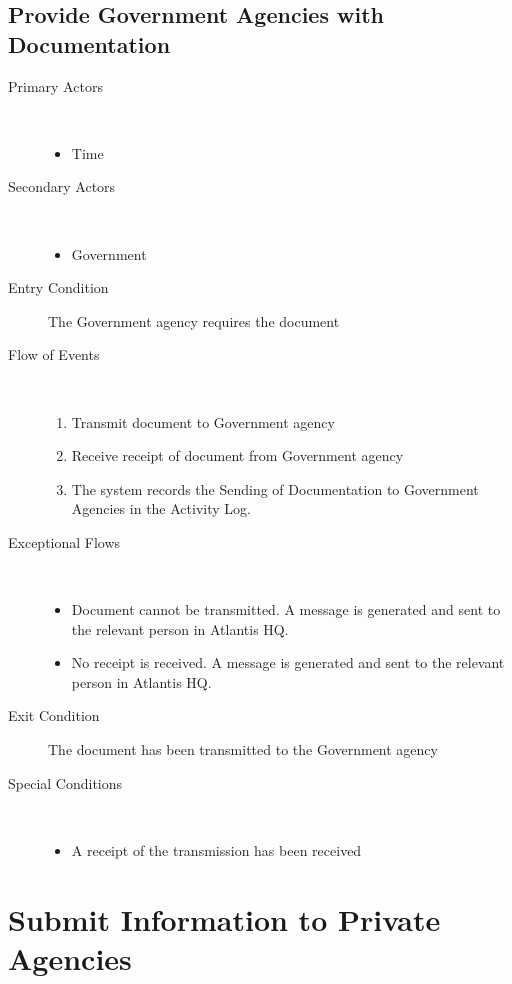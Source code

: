 \documentclass[a4paper,10pt]{report}
\begin{document}
\section{Provide Government Agencies with Documentation}
\begin{description}
\item[Primary Actors] \
  \begin{itemize}
    \item Time
  \end{itemize}
\item[Secondary Actors] \
  \begin{itemize}
    \item Government
  \end{itemize}
\item[Entry Condition]
  The Government agency requires the document
\item[Flow of Events] \
  \begin{enumerate}
    \item Transmit document to Government agency
    \item Receive receipt of document from Government agency
    \item The system records the Sending of Documentation to Government Agencies in the Activity Log.
  \end{enumerate}
\item[Exceptional Flows] \
  \begin{itemize}
    \item Document cannot be transmitted. A message is generated and sent to the relevant person in Atlantis HQ.
    \item No receipt is received. A message is generated and sent to the relevant person in Atlantis HQ.
  \end{itemize}
\item[Exit Condition]
  The document has been transmitted to the Government agency
\item[Special Conditions] \
  \begin{itemize}
    \item A receipt of the transmission has been received
  \end{itemize}
\end{description}

\chapter{Submit Information to Private Agencies}
\end{document}
